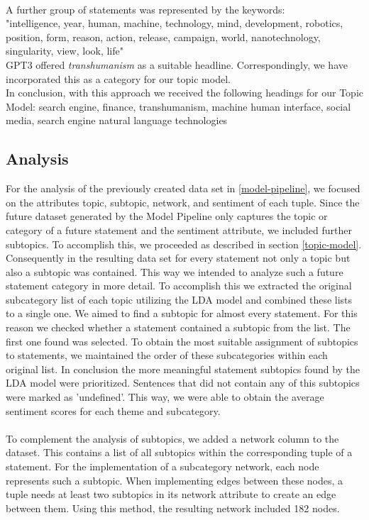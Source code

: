 \\
A further group of statements was represented by the keywords:
\\
"intelligence, year, human, machine, technology, mind, development, robotics, position, form, reason, action, release, campaign, world, nanotechnology, singularity, view, look, life"
\\
GPT3 offered \emph{transhumanism} as a suitable headline.
Correspondingly, we have incorporated this as a category for our topic model.
\\
In conclusion, with this approach we received the following headings for our Topic Model: search engine, finance, transhumanism, machine human interface, social media, search engine natural language technologies


\subsection{Analysis}
For the analysis of the previously created data set in \ref{model-pipeline}, we focused on the attributes topic, subtopic, network, and sentiment of each tuple. 
Since the future dataset generated by the Model Pipeline only captures the topic or category of a future statement and the sentiment attribute, we included further subtopics. To accomplish this, we proceeded as described in section \ref{topic-model}. Consequently in the resulting data set for every statement not only a topic but also a subtopic was contained.
This way we intended to analyze such a future statement category in more detail. To accomplish this we extracted the original subcategory list of each topic utilizing the LDA model and combined these lists to a single one. We aimed to find a subtopic for almost every statement. For this reason we checked whether a statement contained a subtopic from the list. The first one found was selected. To obtain the most suitable assignment of subtopics to statements, we maintained the order of these subcategories within each original list. In conclusion the more meaningful statement subtopics found by the LDA model were prioritized. Sentences that did not contain any of this subtopics were marked as 'undefined'. This way, we were able to obtain the average sentiment scores for each theme and subcategory.
\\
\\
To complement the analysis of subtopics, we added a network column to the dataset. This contains a list of all subtopics within the corresponding tuple of a statement. For the implementation of a subcategory network, each node represents such a subtopic. When implementing edges between these nodes, a tuple needs at least two subtopics in its network attribute to create an edge between them. Using this method, the resulting network included 182 nodes. 
